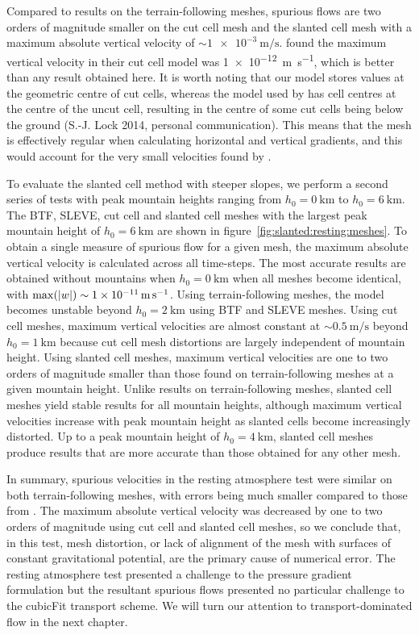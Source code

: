Compared to results on the terrain-following meshes, spurious flows are two orders of magnitude smaller on the cut cell mesh and the slanted cell mesh with a maximum absolute vertical velocity of $\sim \SI{1e-3}{\meter\per\second}$.
\citet{good2014} found the maximum vertical velocity in their cut cell model was \SI{1e-12}{\meter\per\second}, which is better than any result obtained here.  It is worth noting that our model stores values at the geometric centre of cut cells, whereas the model used by \citet{good2014} has cell centres at the centre of the uncut cell, resulting in the centre of some cut cells being below the ground (S.-J. Lock 2014, personal communication).
This means that the mesh is effectively regular when calculating horizontal and vertical gradients, and this would account for the very small velocities found by \citet{good2014}.

To evaluate the slanted cell method with steeper slopes, we perform a second series of tests with peak mountain heights ranging from $h_0 = \SI{0}{\kilo\meter}$ to $h_0 = \SI{6}{\kilo\meter}$.
The BTF, SLEVE, cut cell and slanted cell meshes with the largest peak mountain height of $h_0 = \SI{6}{\kilo\meter}$ are shown in figure~\ref{fig:slanted:resting:meshes}.
To obtain a single measure of spurious flow for a given mesh, the maximum absolute vertical velocity is calculated across all time-steps.
The most accurate results are obtained without mountains when $h_0 = \SI{0}{\kilo\meter}$ when all meshes become identical, with $\max(\left\lvert w \right\rvert) \sim \SI{1e-11}{\meter\per\second}$.
Using terrain-following meshes, the model becomes unstable beyond $h_0 = \SI{2}{\kilo\meter}$ using BTF and SLEVE meshes.
Using cut cell meshes, maximum vertical velocities are almost constant at $\sim \SI{0.5}{\meter\per\second}$ beyond $h_0 = \SI{1}{\kilo\meter}$ because cut cell mesh distortions are largely independent of mountain height.
Using slanted cell meshes, maximum vertical velocities are one to two orders of magnitude smaller than those found on terrain-following meshes at a given mountain height.  Unlike results on terrain-following meshes, slanted cell meshes yield stable results for all mountain heights, although maximum vertical velocities increase with peak mountain height as slanted cells become increasingly distorted.  Up to a peak mountain height of $h_0 = \SI{4}{\kilo\meter}$, slanted cell meshes produce results that are more accurate than those obtained for any other mesh.

In summary, spurious velocities in the resting atmosphere test were similar on both terrain-following meshes, with errors being much smaller compared to those from \citet{klemp2011}.
The maximum absolute vertical velocity was decreased by one to two orders of magnitude using cut cell and slanted cell meshes, so we conclude that, in this test, mesh distortion, or lack of alignment of the mesh with surfaces of constant gravitational potential, are the primary cause of numerical error.
The resting atmosphere test presented a challenge to the pressure gradient formulation but the resultant spurious flows presented no particular challenge to the cubicFit transport scheme.  We will turn our attention to transport-dominated flow in the next chapter.
